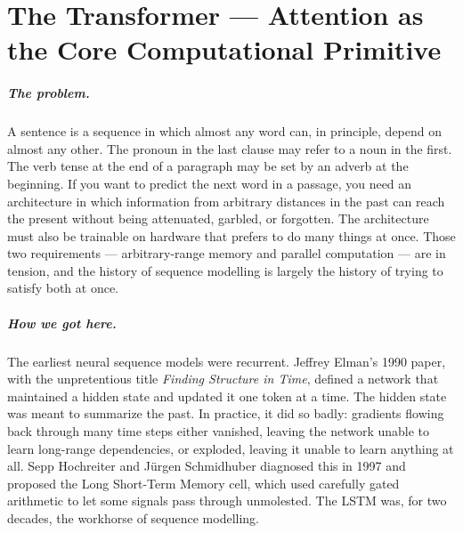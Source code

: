 \chapter{The Transformer --- Attention as the Core Computational Primitive}
\label{chap:transformer}
\label{sec:ch5-transformer}

\scenelabel
\begin{scenestrip}
\end{scenestrip}

\paragraph{The problem.}
A sentence is a sequence in which almost any word can, in principle,
depend on almost any other. The pronoun in the last clause may refer
to a noun in the first. The verb tense at the end of a paragraph may
be set by an adverb at the beginning. If you want to predict the next
word in a passage, you need an architecture in which information from
arbitrary distances in the past can reach the present without being
attenuated, garbled, or forgotten. The architecture must also be
trainable on hardware that prefers to do many things at once. Those
two requirements --- arbitrary-range memory and parallel
computation --- are in tension, and the history of sequence
modelling is largely the history of trying to satisfy both at once.

\paragraph{How we got here.}
The earliest neural sequence models were recurrent. Jeffrey Elman's
1990 paper, with the unpretentious title \emph{Finding Structure in
Time}, defined a network that maintained a hidden state and updated
it one token at a time. The hidden state was meant to summarize the
past. In practice, it did so badly: gradients flowing back through
many time steps either vanished, leaving the network unable to
learn long-range dependencies, or exploded, leaving it unable to
learn anything at all. Sepp Hochreiter and J\"urgen Schmidhuber
diagnosed this in 1997 and proposed the Long Short-Term Memory cell,
which used carefully gated arithmetic to let some signals pass
through unmolested. The LSTM was, for two decades, the workhorse of
sequence modelling.

